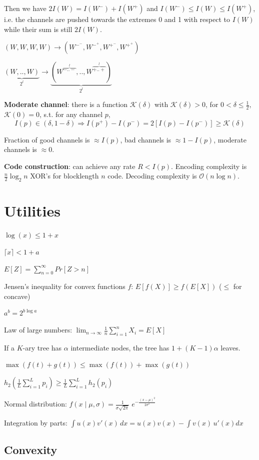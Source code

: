 \documentclass[10pt,a4paper,landscape]{article}
\begin{document}
\begin{multicols*}{4}
Then we have $2I(W) = I(W^-) + I(W^+)$ and $I(W^-) \leq I(W) \leq I(W^+)$, i.e. the channels are pushed towards the extremes 0 and 1 with respect to $I(W)$ while their sum is still $2I(W)$.

$(W,W,W,W) \rightarrow (W^{-^-},W^{-^+},W^{+^-},W^{+^+})$

$\underbrace{(W,..,W)}_{2^l} \rightarrow \underbrace{(W^{\overbrace{-..-}^l},..,W^{\overbrace{+..+}^l})}_{2^l}$

\textbf{Moderate channel}: there is a function $\mathcal{K}(\delta)$ with $\mathcal{K}(\delta) > 0$, for $0 < \delta \leq \frac{1}{2}$, $\mathcal{K}(0) = 0$, s.t. for any channel $p$,
$$ I(p) \in (\delta,1-\delta) \Rightarrow I(p^+) - I(p^-) = 2[I(p) - I(p^-)] \geq \mathcal{K}(\delta)$$

Fraction of good channels is $\approx I(p)$, bad channels is $\approx 1-I(p)$, moderate channels is $\approx 0$.

\textbf{Code construction}: can achieve any rate $R < I(p)$. Encoding complexity is $\frac{n}{2} \log_2 n$ XOR's for blocklength $n$ code. Decoding complexity is $\mathcal{O}(n\log n)$.



\section{Utilities}
$\log(x) \leq 1 + x$

$\lceil x \rceil < 1 + a$

$E[Z] = \sum_{n=0}^{\infty} Pr[Z > n]$

Jensen's inequality for convex functions $f$: $ E[f(X)] \geq f(E[X])$ ($\leq$ for concave)

$a^b = 2^{ b \log a}$

Law of large numbers: $\lim_{n \rightarrow \infty} \frac{1}{n} \sum_{i=1}^n X_i = E[X]$

If a $K$-ary tree has $\alpha$ intermediate nodes, the tree has $1+(K-1)\alpha$ leaves.


$\max(f(t) + g(t)) \leq \max(f(t)) + \max(g(t))$


$h_2 \left(\frac{1}{L}\sum_{i=1}^L p_i \right) \geq \frac{1}{L} \sum_{i=1}^L h_2(p_i)$

Normal distribution: $f(x \; | \; \mu, \sigma) = \frac{1}{\sigma\sqrt{2\pi} } \; e^{ -\frac{(x-\mu)^2}{2\sigma^2} }$

Integration by parts: $\int u(x) v'(x) \, dx = u(x) v(x) - \int v(x) \, u'(x)  dx$ 

\subsection{Convexity}


\end{multicols*}
\end{document}
